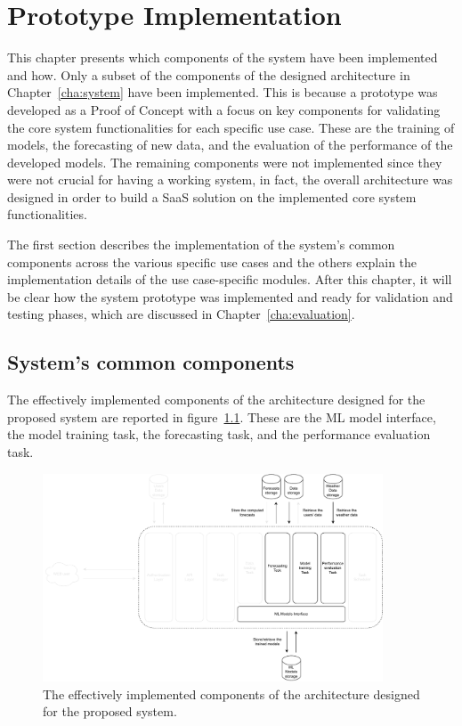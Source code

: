 \chapter{Prototype Implementation}
\label{cha:implementation}
\vspace{0.4 cm}

This chapter presents which components of the system have been implemented and how.
Only a subset of the components of the designed architecture in Chapter~\ref{cha:system} have been implemented.
This is because a prototype was developed as a Proof of Concept with a focus on key components for validating the core system functionalities for each specific use case.
These are the training of models, the forecasting of new data, and the evaluation of the performance of the developed models.
The remaining components were not implemented since they were not crucial for having a working system, in fact, the overall architecture was designed in order to build a SaaS solution on the implemented core system functionalities.

The first section describes the implementation of the system's common components across the various specific use cases and the others explain the implementation details of the use case-specific modules.
After this chapter, it will be clear how the system prototype was implemented and ready for validation and testing phases, which are discussed in Chapter~\ref{cha:evaluation}.


\section{System's common components}
\label{sec:componentsimpl}
\vspace{0.2 cm}

The effectively implemented components of the architecture designed for the proposed system are reported in figure~\ref{fig:implementationcomponents}.
These are the ML model interface, the model training task, the forecasting task, and the performance evaluation task.

\begin{figure}[H]
\centering
\includegraphics[width=0.9\textwidth]{images/implementation_components}
\caption{The effectively implemented components of the architecture designed for the proposed system.}
\label{fig:implementationcomponents}
\end{figure}

